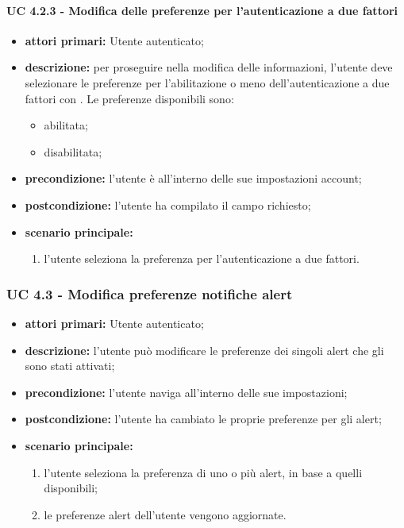 				\paragraph{UC 4.2.3 - Modifica delle preferenze per l'autenticazione a due fattori}
				\begin{itemize}
					\item \textbf{attori primari:} Utente autenticato;
					\item \textbf{descrizione:} per proseguire nella modifica delle informazioni, l'utente deve selezionare le preferenze per l'abilitazione o meno dell'autenticazione a due fattori con . Le preferenze disponibili sono:
					\begin{itemize}
						\item abilitata;
						\item disabilitata;
					\end{itemize}
					\item \textbf{precondizione:} l'utente è all'interno delle sue impostazioni account;
					\item \textbf{postcondizione:} l'utente ha compilato il campo richiesto;
					\item \textbf{scenario principale:}
					\begin{enumerate}
						\item l'utente seleziona la preferenza per l'autenticazione a due fattori.
					\end{enumerate}
				\end{itemize}


			\subsubsection{UC 4.3 - Modifica preferenze notifiche alert}
			\begin{itemize}
				\item \textbf{attori primari:} Utente autenticato;
				\item \textbf{descrizione:} l'utente può modificare le preferenze dei singoli alert che gli sono stati attivati;
				\item \textbf{precondizione:} l'utente naviga all'interno delle sue impostazioni;
				\item \textbf{postcondizione:} l'utente ha cambiato le proprie preferenze per gli alert;
				\item \textbf{scenario principale:}
				\begin{enumerate}
					\item{l'utente seleziona la preferenza di uno o più alert, in base a quelli disponibili;}
					\item{le preferenze alert dell'utente vengono aggiornate.}
				\end{enumerate}
			\end{itemize}	


